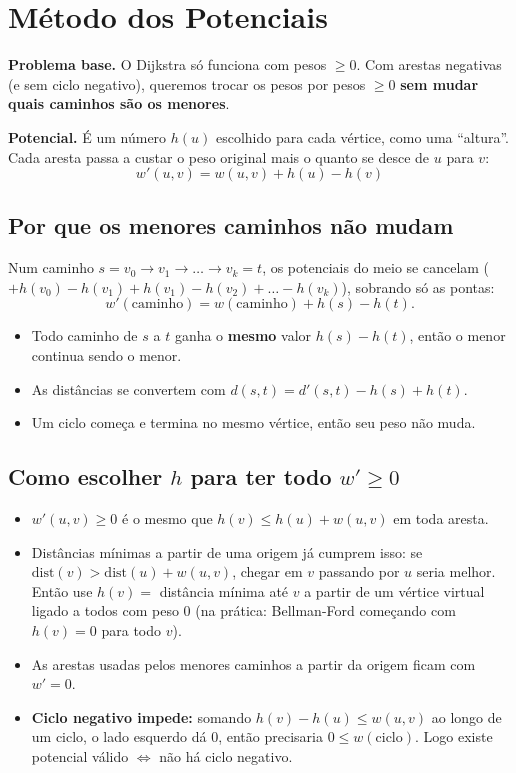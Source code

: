 \section{Método dos Potenciais}

\textbf{Problema base.} O Dijkstra só funciona com pesos $\ge 0$. Com arestas negativas (e sem ciclo negativo),
queremos trocar os pesos por pesos $\ge 0$ \textbf{sem mudar quais caminhos são os menores}.

\textbf{Potencial.} É um número $h(u)$ escolhido para cada vértice, como uma ``altura''. Cada aresta passa a custar
o peso original mais o quanto se desce de $u$ para $v$:
\[
\boxed{w'(u, v) = w(u, v) + h(u) - h(v)}
\]

\subsection*{Por que os menores caminhos não mudam}

Num caminho $s = v_0 \to v_1 \to \dots \to v_k = t$, os potenciais do meio se cancelam
($+h(v_0) - h(v_1) + h(v_1) - h(v_2) + \dots - h(v_k)$), sobrando só as pontas:
\[
w'(\text{caminho}) = w(\text{caminho}) + h(s) - h(t).
\]
\begin{itemize}
  \item Todo caminho de $s$ a $t$ ganha o \textbf{mesmo} valor $h(s) - h(t)$, então o menor continua sendo o menor.
  \item As distâncias se convertem com $d(s, t) = d'(s, t) - h(s) + h(t)$.
  \item Um ciclo começa e termina no mesmo vértice, então seu peso não muda.
\end{itemize}

\subsection*{Como escolher $h$ para ter todo $w' \ge 0$}

\begin{itemize}
  \item $w'(u, v) \ge 0$ é o mesmo que $h(v) \le h(u) + w(u, v)$ em toda aresta.
  \item Distâncias mínimas a partir de uma origem já cumprem isso: se $\text{dist}(v) > \text{dist}(u) + w(u, v)$,
        chegar em $v$ passando por $u$ seria melhor. Então use $h(v) = $ distância mínima até $v$ a partir de um vértice
        virtual ligado a todos com peso $0$ (na prática: Bellman-Ford começando com $h(v) = 0$ para todo $v$).
  \item As arestas usadas pelos menores caminhos a partir da origem ficam com $w' = 0$.
  \item \textbf{Ciclo negativo impede:} somando $h(v) - h(u) \le w(u, v)$ ao longo de um ciclo, o lado esquerdo dá $0$,
        então precisaria $0 \le w(\text{ciclo})$. Logo existe potencial válido $\iff$ não há ciclo negativo.
\end{itemize}
